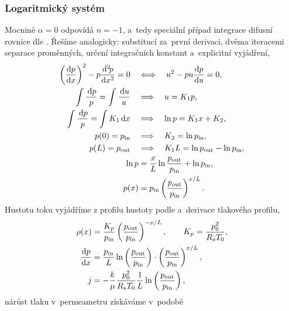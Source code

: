 \subsubsection{Logaritmický systém}\label{sss:logaritmicky_system}
Mocnině $\alpha=0$ odpovídá $n=-1$, a~tedy speciální případ integrace difusní rovnice dle . Řešíme analogicky: substitucí za~první derivaci, dvěma iteracemi separace proměnných, určení integračních konstant a~explicitní vyjádření,
\begin{subequations}
\begin{align}
    \left(\frac{\mathrm{d} p}{\mathrm{d} x}\right)^2 - p\frac{\mathrm{d}^2 \! p}{\mathrm{d} x^2} = 0\quad&\Longleftrightarrow\quad u^2 -pu\frac{\mathrm{d} p}{\mathrm{d} u}=0,\\
    \int \frac{\,\mathrm{d}{p}}{p}=\int\frac{\,\mathrm{d}{u}}{u}\quad&\Longrightarrow\quad u=K_1p,\\
    \int \frac{\,\mathrm{d}{p}}{p}=\int K_1 \,\mathrm{d}{x} \quad&\Longrightarrow\quad \ln{p}=K_1x+K_2,\\
    p(0)=p_{\mathrm{in}}\quad&\Longrightarrow\quad K_2=\ln{p_{\mathrm{in}}},\\
    p(L)=p_{\mathrm{out}}\quad&\Longrightarrow\quad K_1L=\ln{p_{\mathrm{out}}}-\ln{p_{\mathrm{in}}},\\
    \ln{p}&=\frac{x}{L}\ln{\frac{p_{\mathrm{out}}}{p_{\mathrm{in}}}}+\ln{p_{\mathrm{in}}},\\
    p(x)&=p_{\mathrm{in}}\left(\frac{p_{\mathrm{out}}}{p_{\mathrm{in}}}\right)^{{x}/{L}}.
\end{align}
\end{subequations}
Hustotu toku vyjádříme z profilu hustoty podle  a~derivace tlakového profilu,
\begin{subequations}
\begin{align}
\rho(x)&=\frac{K_p}{p_{\mathrm{in}}}\left(\frac{p_{\mathrm{out}}}{p_{\mathrm{in}}}\right)^{-{x}/{L}},\qquad K_p=\frac{p_0^2}{R_s T_0},\\
\frac{\mathrm{d} p}{\mathrm{d} x}&=\frac{p_{\mathrm{in}}}{L}\ln\left(\frac{p_{\mathrm{out}}}{p_{\mathrm{in}}}\right)\cdot \left(\frac{p_{\mathrm{out}}}{p_{\mathrm{in}}}\right)^{{x}/{L}},\\
j&=-\frac{k}{\mu}\frac{p_0^2}{R_s T_0}\frac{1}{L}\ln\left(\frac{p_{\mathrm{out}}}{p_{\mathrm{in}}}\right),
\end{align}
\end{subequations}
nárůst tlaku v~permeametru získáváme v~podobě
